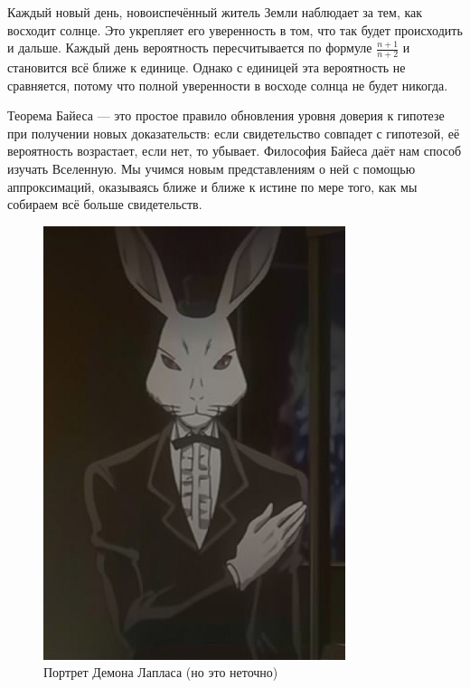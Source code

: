 Каждый новый день, новоиспечённый житель Земли наблюдает за тем, как восходит солнце. Это укрепляет его уверенность в том, что так будет происходить и дальше.  Каждый день вероятность пересчитывается по формуле $\frac{n+1}{n+2}$ и становится всё ближе к единице. Однако с единицей эта вероятность не сравняется, потому что полной уверенности в восходе солнца не будет никогда.

Теорема Байеса --- это простое правило обновления уровня доверия к гипотезе при получении новых доказательств: если свидетельство совпадет с гипотезой, её вероятность возрастает, если нет, то убывает.   Философия Байеса даёт нам способ изучать Вселенную. Мы учимся новым представлениям о ней с помощью аппроксимаций, оказываясь ближе и ближе к истине по мере того, как мы собираем всё больше свидетельств.

\begin{figure}
	\centering \includegraphics[width=0.8\linewidth]{images/demon.jpg}
	\caption{Портрет Демона Лапласа (но это неточно)}
\end{figure} 

